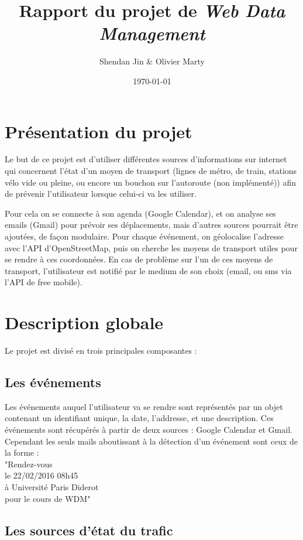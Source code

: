 \documentclass[a4paper, 8pt]{article}
\title{\vspace{-2cm}Rapport du projet de \emph{Web Data Management}}
\author{Shendan Jin \& Olivier Marty}
\date\today
\begin{document}
\maketitle

\section{Présentation du projet}

Le but de ce projet est d'utiliser différentes sources d'informations sur
internet qui concernent l'état d'un moyen de transport (lignes de
métro, de train, stations vélo vide ou pleine, ou encore un bouchon sur
l'autoroute (non implémenté)) afin de prévenir l'utilisateur lorsque celui-ci va
les utiliser.

Pour cela on se connecte à son agenda (Google Calendar), et on analyse ses emails
(Gmail) pour prévoir ses déplacements, mais d'autres sources pourrait être
ajoutées, de façon modulaire.
Pour chaque événement, on géolocalise l'adresse avec l'API d'OpenStreetMap,
puis on cherche les moyens de transport utiles pour se rendre à ces coordonnées.
En cas de problème sur l'un de ces moyens de transport, l'utilisateur est
notifié par le medium de son choix (email, ou sms via l'API de free mobile).

\section{Description globale}

Le projet est divisé en trois principales composantes :

\subsection{Les événements}

Les événements auquel l'utilisateur va se rendre sont représentés par un objet
contenant un identifiant unique, la date, l'addresse, et une description.
Ces événements sont récupérés à partir de deux sources : Google Calendar et
Gmail.
Cependant les seuls mails aboutissant à la détection d'un événement sont ceux de la forme :\\
"Rendez-vous\\
le 22/02/2016 08h45\\
à Université Paris Diderot\\
pour le cours de WDM"


\subsection{Les sources d'état du trafic}
\end{document}
